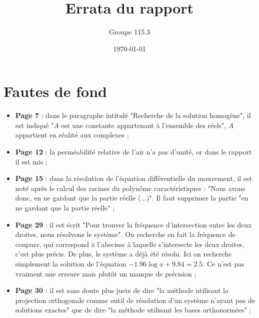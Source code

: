\documentclass{article}
\title{Errata du rapport}
\author{Groupe 115.3}
\date{\today}
\begin{document}
\maketitle

\section{Fautes de fond}

\begin{itemize}
	\item \textbf{Page 7} : dans le paragraphe intitulé "Recherche de la solution homogène", il est indiqué 
	"$A$ est une constante appartenant à l'ensemble des réels", $A$ appartient en réalité aux complexes ;
	\item \textbf{Page 12} : la perméabilité relative de l'air n'a pas d'unité, or dans le rapport il est mis \unit{}{\henry\per\meter} ;
	\item \textbf{Page 15} : dans la résolution de l'équation différentielle du mouvement, il est noté après le calcul
	des racines du polynôme caractéristiques : "Nous avons donc, en ne gardant que la partie réelle (...)".
	Il faut supprimer la partie "en ne gardant que la partie réelle" ;
	\item \textbf{Page 29} : il est écrit "Pour trouver la fréquence d'intersection entre les deux droites, nous résolvons le système".
	On recherche en fait la fréquence de coupure, qui correspond à l'abscisse à laquelle s'intersecte les
	deux droites, c'est plus précis. De plus, le système a déjà été résolu. Ici on recherche simplement la
	solution de l'équation $-1.96\log{x} + 9.84 = 2.5$. Ce n'est pas vraiment une erreure mais plutôt un manque
	de précision ;
	\item \textbf{Page 30} : il est sans doute plus juste de dire "la méthode utilisant la projection orthogonale comme outil
	de résolution d'un système n'ayant pas de solutions exactes" que de dire "la méthode utilisant les
	bases orthonormées" ;
\end{itemize}
\end{document}
